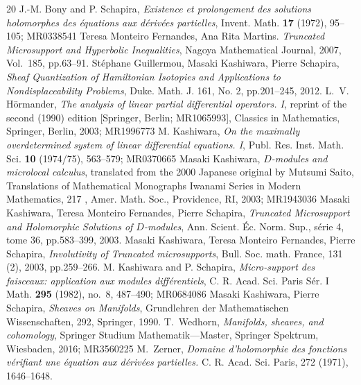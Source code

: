 \begin{thebibliography}{20} 
   J.-M. Bony and P. Schapira, 
  \textit{Existence et prolongement des solutions holomorphes des \'equations aux d\'eriv\'ees partielles}, 
  Invent. Math. {\bf 17} (1972), 95--105; MR0338541
   Teresa Monteiro Fernandes, Ana Rita Martins. 
  \textit{Truncated Microsupport and Hyperbolic Inequalities}, 
  Nagoya Mathematical Journal, 2007, Vol.\ 185, pp.63--91. 
   St\'ephane Guillermou, 
  Masaki Kashiwara, Pierre Schapira, 
  \textit{Sheaf Quantization of Hamiltonian Isotopies and Applications to Nondisplaceability Problems}, 
  Duke. Math. J. 161, No. 2, pp.201--245, 2012.  
   L.~V. H\"ormander, 
  \textit{The analysis of linear partial differential operators. I}, 
  reprint of the second (1990) edition [Springer, Berlin; MR1065993], 
  Classics in Mathematics, Springer, Berlin, 2003; MR1996773
   M. Kashiwara, 
  \textit{On the maximally overdetermined system of linear differential equations. I}, 
  Publ. Res. Inst. Math. Sci. {\bf 10} (1974/75), 563--579; MR0370665
   Masaki Kashiwara, 
    \textit{$D$-modules and microlocal calculus}, 
    translated from the 2000 Japanese original by Mutsumi Saito, 
    Translations of Mathematical Monographs Iwanami Series 
    in Modern Mathematics, 217 , Amer. Math. Soc., 
    Providence, RI, 2003; MR1943036
   Masaki Kashiwara, Teresa Monteiro Fernandes, Pierre Schapira, 
    \textit{Truncated Microsupport and Holomorphic Solutions 
    of \(D\)-modules}, 
    Ann. Scient. \'Ec. Norm. Sup., s\'erie 4, tome 36, 
    pp.583--399, 2003.
   Masaki Kashiwara, Teresa Monteiro Fernandes, Pierre Schapira, 
		\textit{Involutivity of Truncated microsupports}, 
		Bull. Soc. math. France, 131 (2), 2003, 
		pp.259--266.
   M. Kashiwara and P. Schapira, 
  \textit{Micro-support des faisceaux: 
  application aux modules diff\'erentiels}, 
  C. R. Acad. Sci. Paris S\'er. I Math. {\bf 295} (1982), 
  no.~8, 487--490; MR0684086
   Masaki Kashiwara, Pierre Schapira, 
    \textit{Sheaves on Manifolds}, 
    Grundlehren der Mathematischen Wissenschaften, 292, Springer, 1990.
   T.~Wedhorn, \textit{ Manifolds, sheaves, and cohomology}, Springer Studium Mathematik---Master, Springer Spektrum, Wiesbaden, 2016; MR3560225
   M.~Zerner,  
    \textit{Domaine d’holomorphie des fonctions v\'erifiant 
    une \'equation aux d\'eriv\'ees partielles.} 
    C. R. Acad. Sci. Paris, 272 (1971), 1646--1648.
\end{thebibliography}



